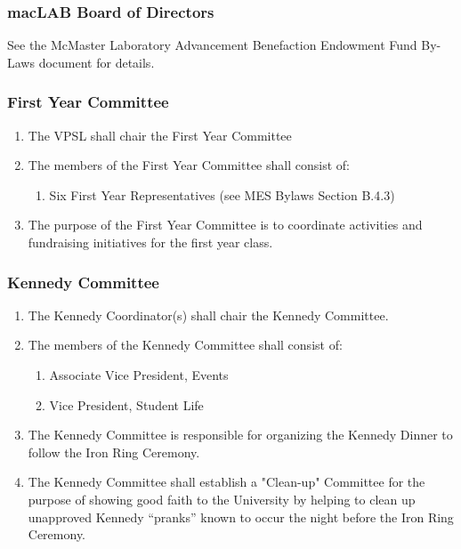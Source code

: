 \subsubsection{macLAB Board of Directors}
\label{maclab-board-of-directors}
See the McMaster Laboratory Advancement Benefaction Endowment Fund
By-Laws document for details.

\subsubsection{First Year Committee}
\label{first-year-committee}

\begin{enumerate}
 \item
  The VPSL shall chair the First Year Committee
 \item
  The members of the First Year Committee shall consist of:

  \begin{enumerate}
   \item
    Six First Year Representatives (see MES Bylaws Section B.4.3)
  \end{enumerate}
 \item
  The purpose of the First Year Committee is to coordinate activities and fundraising initiatives for the first year class.
\end{enumerate}

\subsubsection{Kennedy Committee}
\label{kennedy-committee}
\begin{enumerate}
 \item
  The Kennedy Coordinator(s) shall chair the Kennedy Committee.
 \item
  The members of the Kennedy Committee shall consist of:

  \begin{enumerate}
   \item
    Associate Vice President, Events
   \item
    Vice President, Student Life
  \end{enumerate}
 \item
  The Kennedy Committee is responsible for organizing the Kennedy Dinner to follow the Iron Ring Ceremony.
 \item
  The Kennedy Committee shall establish a "Clean-up" Committee for the purpose of showing good faith to the University by helping to clean up unapproved Kennedy ``pranks'' known to occur the night before the Iron Ring Ceremony.

\end{enumerate}

